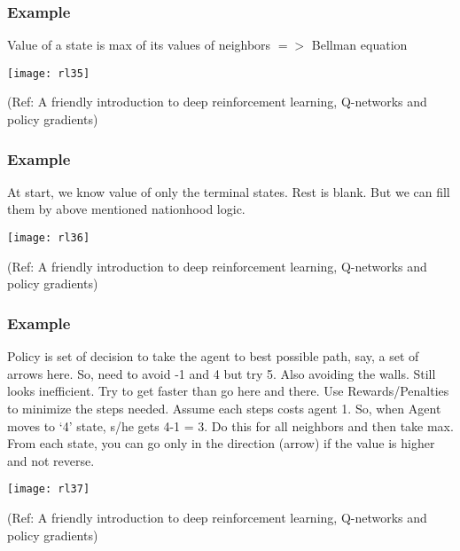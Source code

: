 \begin{frame}[fragile]\frametitle{Example}

Value of a state is max of its values of neighbors $=>$ Bellman equation

\begin{center}
\texttt{[image: rl35]}
\end{center}

{\tiny (Ref: A friendly introduction to deep reinforcement learning, Q-networks and policy gradients)}

\end{frame}

\begin{frame}[fragile]\frametitle{Example}

At start, we know value of only the terminal states. Rest is blank. But we can fill them by above mentioned nationhood logic.

\begin{center}
\texttt{[image: rl36]}
\end{center}

{\tiny (Ref: A friendly introduction to deep reinforcement learning, Q-networks and policy gradients)}

\end{frame}

\begin{frame}[fragile]\frametitle{Example}

Policy is set of decision to take the agent to best possible path, say, a set of arrows here. So, need to avoid -1 and 4 but try 5. Also avoiding the walls. Still looks inefficient. Try to get faster than go here and there. Use Rewards/Penalties to minimize the steps needed. Assume each steps costs agent 1. So, when Agent moves to ‘4’ state, s/he gets 4-1 = 3. Do this for all neighbors and then take max. From each state, you can go only in the direction (arrow) if the value is higher and not reverse.

\begin{center}
\texttt{[image: rl37]}
\end{center}

{\tiny (Ref: A friendly introduction to deep reinforcement learning, Q-networks and policy gradients)}

\end{frame}


